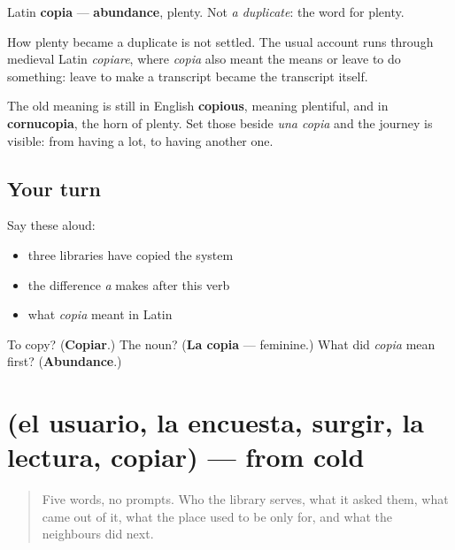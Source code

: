 \begin{cousinweb}
Latin \textbf{copia} — \textbf{abundance}, plenty. Not \emph{a duplicate}: the word for plenty.

How plenty became a duplicate is not settled. The usual account runs through medieval Latin \emph{copiare}, where \emph{copia} also meant the means or leave to do something: leave to make a transcript became the transcript itself.

The old meaning is still in English \textbf{copious}, meaning plentiful, and in \textbf{cornucopia}, the horn of plenty. Set those beside \emph{una copia} and the journey is visible: from having a lot, to having another one.
\end{cousinweb}

\subsection*{Your turn}
Say these aloud:

\begin{itemize}
\raggedright
  \item three libraries have copied the system
  \item the difference \emph{a} makes after this verb
  \item what \emph{copia} meant in Latin
\end{itemize}

\begin{tcolorbox}[breakable,colback=teal!4,colframe=teal!35!black,title={Before you move on}]
To copy? (\textbf{Copiar}.) The noun? (\textbf{La copia} — feminine.) What did \emph{copia} mean first? (\textbf{Abundance}.)
\end{tcolorbox}
\section[(el usuario, la encuesta, surgir, la …]{(el usuario, la encuesta, surgir, la lectura, copiar) — from cold}

\label{lesson:ES-R472-repaso-encuesta}



\begin{quote}
Five words, no prompts. Who the library serves, what it asked them, what came out of it, what the place used to be only for, and what the neighbours did next.
\end{quote}

